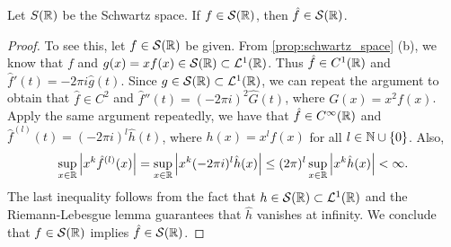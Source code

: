 \begin{proposition}\label{prop:schwartz_fourier_transform}
    Let $S(\mathbb{R})$ be the Schwartz space. If $f\in\mathcal{S}(\mathbb{R})$, then 
    $\hat{f}\in\mathcal{S}(\mathbb{R})$.
\end{proposition}
\begin{proof}
    To see this, let $f\in \mathcal{S}(\mathbb{R})$ be given. From \cref{prop:schwartz_space} 
    (b), we know that $f$ and $g(x) = xf(x)\in\mathcal{S}(\mathbb{R})\subset\mathcal{L}^1(\mathbb{R})$. Thus 
    $\hat{f}\in C^1(\mathbb{R})$ and $\hat{f}'(t) = -2\pi i \hat{g}(t)$.
    Since $g\in\mathcal{S}(\mathbb{R})\subset\mathcal{L}^1(\mathbb{R})$, we can repeat the argument to 
    obtain that $\hat{f}\in C^2$ and $\hat{f}''(t) = (-2\pi i)^2\hat{G}(t)$, 
    where $G(x) = x^2f(x)$. Apply the same argument repeatedly, we have that 
    $\hat{f}\in C^\infty(\mathbb{R})$ and $\hat{f}^{(l)}(t) = (-2\pi i)^l\hat{h}(t)$, 
    where $h(x) = x^lf(x)$ for all $l\in\mathbb{N}\cup\left\{ {0} \right\}$. Also, 
    \begin{equation*}
        \sup_{x\in\mathbb{R}} \left\lvert {x^k\hat{f}^{(l)}(x)} \right\rvert = \sup_{x\in\mathbb{R}} \left\lvert {x^k(-2\pi i)^l\hat{h}(x)} \right\rvert 
        \leq (2\pi)^l\sup_{x\in\mathbb{R}}\left\lvert {x^k\hat{h}(x)} \right\rvert < \infty.
    \end{equation*}
    The last inequality follows from the fact that $h\in \mathcal{S}(\mathbb{R})\subset\mathcal{L}^1(\mathbb{R})$ 
    and the Riemann-Lebesgue lemma guarantees that $\hat{h}$ vanishes at infinity. 
    We conclude that $f\in\mathcal{S}(\mathbb{R})$ implies $\hat{f}\in\mathcal{S}(\mathbb{R})$. 
\end{proof}

